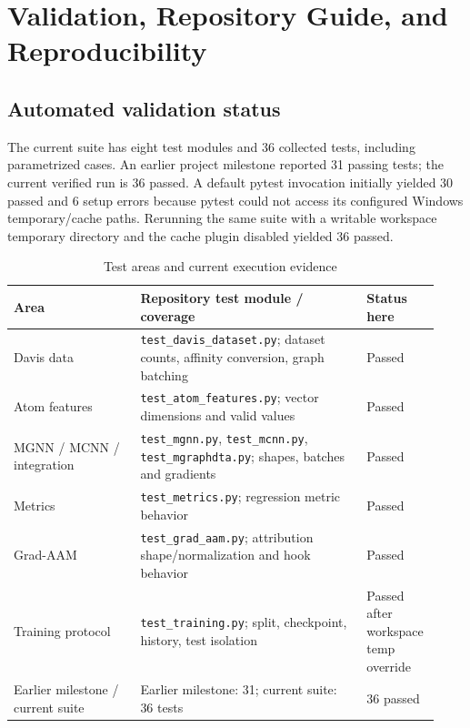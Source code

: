 ﻿\chapter{Validation, Repository Guide, and Reproducibility}
\section{Automated validation status}
The current suite has eight test modules and 36 collected tests, including parametrized cases. An earlier project milestone reported 31 passing tests; the current verified run is 36 passed. A default pytest invocation initially yielded 30 passed and 6 setup errors because pytest could not access its configured Windows temporary/cache paths. Rerunning the same suite with a writable workspace temporary directory and the cache plugin disabled yielded 36 passed.

\begin{table}[H]\centering\caption{Test areas and current execution evidence}\label{tab:tests}
\begin{tabular}{p{0.29\linewidth}p{0.5\linewidth}p{0.14\linewidth}}
\toprule Area & Repository test module / coverage & Status here\\
\midrule
Davis data & \texttt{test\_davis\_dataset.py}; dataset counts, affinity conversion, graph batching & Passed\\
Atom features & \texttt{test\_atom\_features.py}; vector dimensions and valid values & Passed\\
MGNN / MCNN / integration & \texttt{test\_mgnn.py}, \texttt{test\_mcnn.py}, \texttt{test\_mgraphdta.py}; shapes, batches and gradients & Passed\\
Metrics & \texttt{test\_metrics.py}; regression metric behavior & Passed\\
Grad-AAM & \texttt{test\_grad\_aam.py}; attribution shape/normalization and hook behavior & Passed\\
Training protocol & \texttt{test\_training.py}; split, checkpoint, history, test isolation & Passed after workspace temp override\\
Earlier milestone / current suite & Earlier milestone: 31; current suite: 36 tests & 36 passed\\
\bottomrule
\end{tabular}
\end{table}

